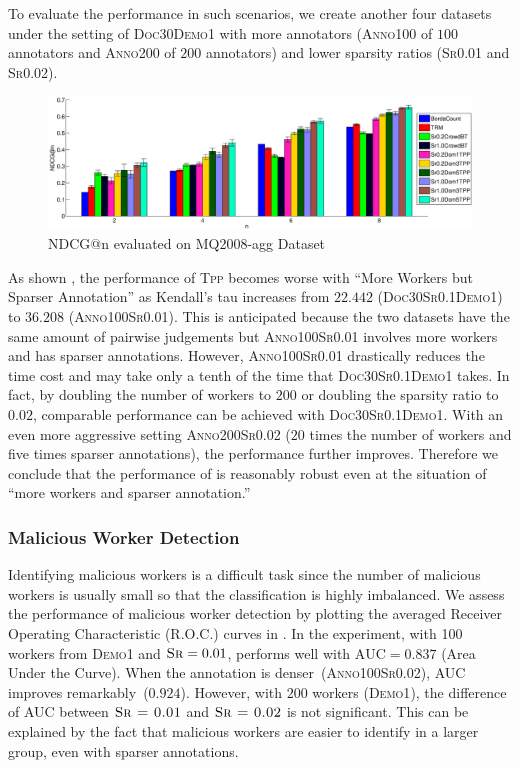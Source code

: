 To evaluate the performance in such scenarios, we create another four datasets
under the setting of \textsc{Doc30Demo1} with more annotators (\textsc{Anno100}
of $100$ annotators and \textsc{Anno200} of $200$ annotators) and lower sparsity
ratios (\textsc{Sr0.01} and \textsc{Sr0.02}).

\begin{figure}[t!]
    \includegraphics[scale= .4,trim={5cm 0 0 0},clip
      ]{crowd-thurstonian/figure/mq2008_agg.eps}
    \caption{NDCG@n evaluated on MQ2008-agg Dataset}
  \label{fig::mq2008_agg_jet}
\end{figure}

As shown , the performance of \textsc{Tpp} becomes
worse with ``More Workers but Sparser Annotation'' as Kendall's tau increases
from $22.442$ (\textsc{Doc30Sr0.1Demo1}) to $36.208$ (\textsc{Anno100Sr0.01}).
This is anticipated because the two datasets have the same amount of pairwise
judgements but \textsc{Anno100Sr0.01} involves more workers and has sparser
annotations.  However, \textsc{Anno100Sr0.01} drastically reduces the time cost
and may take only a tenth of the time that \textsc{Doc30Sr0.1Demo1} takes. In
fact, by doubling the number of workers to $200$ or doubling the sparsity ratio
to $0.02$, comparable performance can be achieved with \textsc{Doc30Sr0.1Demo1}.
With an even more aggressive setting \textsc{Anno200Sr0.02} ($20$ times the
number of workers and five times sparser annotations), the performance further
improves. Therefore we conclude that the performance of \tpp{} is reasonably
robust even at the situation of ``more workers and sparser annotation.''


\subsubsection{Malicious Worker Detection} Identifying malicious workers is a
difficult task since the number of malicious workers is usually small so that
the classification is highly imbalanced. We assess the performance of malicious
worker detection by plotting the averaged Receiver Operating Characteristic
(R.O.C.) curves in .  In the experiment, with 100 workers
from \textsc{Demo1} and $\textsc{Sr} = 0.01$, \tpp{} performs well with
$\mathrm{AUC}=0.837$ (Area Under the Curve).  When the annotation is
denser~(\textsc{Anno100Sr0.02}),  AUC improves remarkably~($0.924$).  However,
with $200$ workers (\textsc{Demo1}), the difference of AUC between $\textsc{Sr =
0.01}$ and $\textsc{Sr = 0.02}$ is not significant. This can be explained by the
fact that malicious workers are easier to identify in a larger group, even with
sparser annotations.

